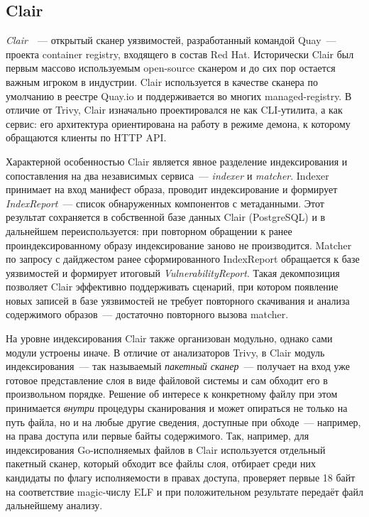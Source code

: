 \subsection{Clair}

\textit{Clair}~\cite{clair}~--- открытый сканер уязвимостей, разработанный командой Quay~--- проекта container registry, входящего в состав Red Hat. Исторически Clair был первым массово используемым open-source сканером и до сих пор остается важным игроком в индустрии. Clair используется в качестве сканера по умолчанию в реестре Quay.io и поддерживается во многих managed-registry. В отличие от Trivy, Clair изначально проектировался не как CLI-утилита, а как сервис: его архитектура ориентирована на работу в режиме демона, к которому обращаются клиенты по HTTP API.

Характерной особенностью Clair является явное разделение индексирования и сопоставления на два независимых сервиса~--- \textit{indexer} и \textit{matcher}. Indexer принимает на вход манифест образа, проводит индексирование и формирует \textit{IndexReport}~--- список обнаруженных компонентов с метаданными. Этот результат сохраняется в собственной базе данных Clair (PostgreSQL) и в дальнейшем переиспользуется: при повторном обращении к ранее проиндексированному образу индексирование заново не производится. Matcher по запросу с дайджестом ранее сформированного IndexReport обращается к базе уязвимостей и формирует итоговый \textit{VulnerabilityReport}. Такая декомпозиция позволяет Clair эффективно поддерживать сценарий, при котором появление новых записей в базе уязвимостей не требует повторного скачивания и анализа содержимого образов~--- достаточно повторного вызова matcher.

На уровне индексирования Clair также организован модульно, однако сами модули устроены иначе. В отличие от анализаторов Trivy, в Clair модуль индексирования~--- так называемый \textit{пакетный сканер}~--- получает на вход уже готовое представление слоя в виде файловой системы и сам обходит его в произвольном порядке. Решение об интересе к конкретному файлу при этом принимается \textit{внутри} процедуры сканирования и может опираться не только на путь файла, но и на любые другие сведения, доступные при обходе~--- например, на права доступа или первые байты содержимого. Так, например, для индексирования Go-исполняемых файлов в Clair используется отдельный пакетный сканер, который обходит все файлы слоя, отбирает среди них кандидаты по флагу исполняемости в правах доступа, проверяет первые 18 байт на соответствие magic-числу ELF и при положительном результате передаёт файл дальнейшему анализу.

